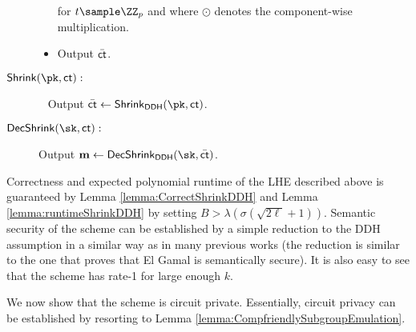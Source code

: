 \begin{description}
\begin{itemize}

for $t\sample \ZZ_p$ and where $\odot$ denotes the component-wise multiplication.
\item Output $\bar {\mathsf{ct}}$.
\end{itemize}

\item[$\mathsf{Shrink}(\pk,\ct):$]~ Output $\bar \ct\leftarrow\mathsf{Shrink}_\mathsf{DDH}(\pk,\ct)$.

\item[$\mathsf{DecShrink}(\sk,\ct):$] Output $\mn\leftarrow\mathsf{DecShrink}_\mathsf{DDH}(\sk,\bar \ct)$.
\end{description}

Correctness and expected polynomial runtime of the LHE described above  is guaranteed by Lemma \ref{lemma:CorrectShrinkDDH} and Lemma \ref{lemma:runtimeShrinkDDH} by setting $B>\lambda(\sigma(\sqrt{2\ell}+1))$. Semantic security of the scheme can be established by a simple reduction to the DDH assumption in a similar way as in many previous works (the reduction is similar to the one that proves that El Gamal is semantically secure). It is also easy to see that the scheme has rate-1 for large enough $k$.

We now show that the scheme is circuit private. Essentially, circuit privacy can be established by resorting to Lemma \ref{lemma:CompfriendlySubgroupEmulation}.

